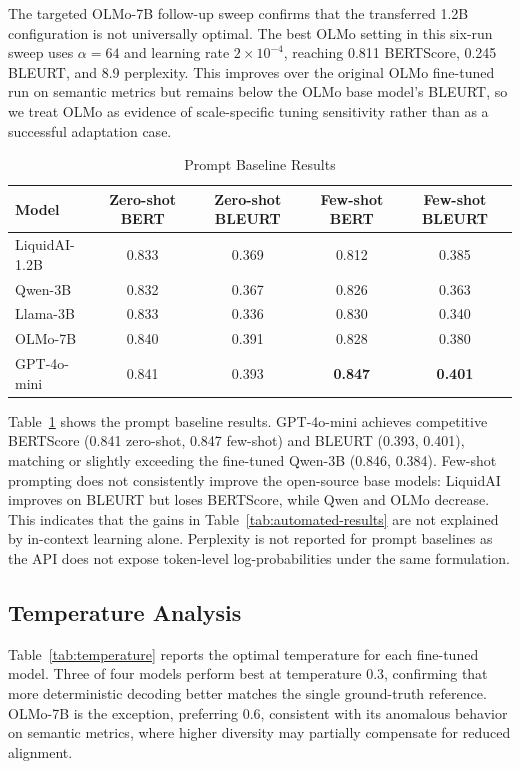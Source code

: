 \documentclass[conference]{IEEEtran}
\begin{document}
The targeted OLMo-7B follow-up sweep confirms that the transferred 1.2B configuration is not universally optimal. The best OLMo setting in this six-run sweep uses $\alpha{=}64$ and learning rate $2{\times}10^{-4}$, reaching 0.811 BERTScore, 0.245 BLEURT, and 8.9 perplexity. This improves over the original OLMo fine-tuned run on semantic metrics but remains below the OLMo base model's BLEURT, so we treat OLMo as evidence of scale-specific tuning sensitivity rather than as a successful adaptation case.

\begin{table}[ht]
\centering
\caption{Prompt Baseline Results}
\label{tab:prompt-baseline}
\begin{tabular}{lcccc}
\toprule
\textbf{Model} & \textbf{Zero-shot BERT} & \textbf{Zero-shot BLEURT} & \textbf{Few-shot BERT} & \textbf{Few-shot BLEURT} \\
\midrule
LiquidAI-1.2B & 0.833 & 0.369 & 0.812 & 0.385 \\
Qwen-3B & 0.832 & 0.367 & 0.826 & 0.363 \\
Llama-3B & 0.833 & 0.336 & 0.830 & 0.340 \\
OLMo-7B & 0.840 & 0.391 & 0.828 & 0.380 \\
GPT-4o-mini & 0.841 & 0.393 & \textbf{0.847} & \textbf{0.401} \\
\bottomrule
\end{tabular}
\end{table}
Table~\ref{tab:prompt-baseline} shows the prompt baseline results. GPT-4o-mini achieves competitive BERTScore (0.841 zero-shot, 0.847 few-shot) and BLEURT (0.393, 0.401), matching or slightly exceeding the fine-tuned Qwen-3B (0.846, 0.384). Few-shot prompting does not consistently improve the open-source base models: LiquidAI improves on BLEURT but loses BERTScore, while Qwen and OLMo decrease. This indicates that the gains in Table~\ref{tab:automated-results} are not explained by in-context learning alone. Perplexity is not reported for prompt baselines as the API does not expose token-level log-probabilities under the same formulation.



\subsection{Temperature Analysis}

Table~\ref{tab:temperature} reports the optimal temperature for each fine-tuned model. Three of four models perform best at temperature 0.3, confirming that more deterministic decoding better matches the single ground-truth reference. OLMo-7B is the exception, preferring 0.6, consistent with its anomalous behavior on semantic metrics, where higher diversity may partially compensate for reduced alignment.
\end{document}
